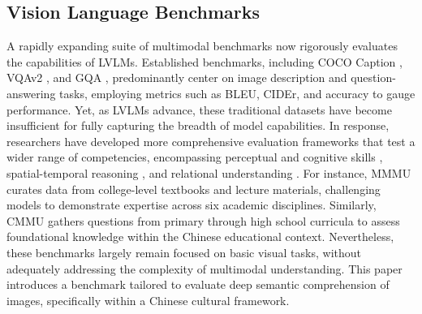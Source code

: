 \subsection{Vision Language Benchmarks} A rapidly expanding suite of multimodal benchmarks now rigorously evaluates the capabilities of LVLMs. Established benchmarks, including COCO Caption \cite{chen2015microsoftcococaptionsdata}, VQAv2 \cite{Goyal_2017_CVPR}, and GQA \cite{Hudson_2019_CVPR}, predominantly center on image description and question-answering tasks, employing metrics such as BLEU, CIDEr, and accuracy to gauge performance. Yet, as LVLMs advance, these traditional datasets have become insufficient for fully capturing the breadth of model capabilities. In response, researchers have developed more comprehensive evaluation frameworks that test a wider range of competencies, encompassing perceptual and cognitive skills \cite{fu2024mmecomprehensiveevaluationbenchmark}, spatial-temporal reasoning \cite{li2023seedbenchbenchmarkingmultimodalllms}, and relational understanding \cite{liu2025mmbench}. For instance, MMMU \cite{Yue_2024_CVPR} curates data from college-level textbooks and lecture materials, challenging models to demonstrate expertise across six academic disciplines. Similarly, CMMU \cite{he2024cmmubenchmarkchinesemultimodal} gathers questions from primary through high school curricula to assess foundational knowledge within the Chinese educational context. Nevertheless, these benchmarks largely remain focused on basic visual tasks, without adequately addressing the complexity of multimodal understanding. This paper introduces a benchmark tailored to evaluate deep semantic comprehension of images, specifically within a Chinese cultural framework.
